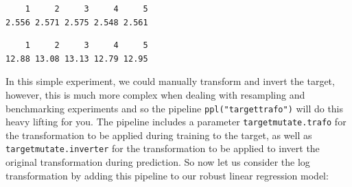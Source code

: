 \begin{verbatim}
    1     2     3     4     5 
2.556 2.571 2.575 2.548 2.561 
\end{verbatim}

\begin{Shaded}
\begin{Highlighting}[]
\end{Highlighting}
\end{Shaded}

\begin{verbatim}
    1     2     3     4     5 
12.88 13.08 13.13 12.79 12.95 
\end{verbatim}

In this simple experiment, we could manually transform and invert the
target, however, this is much more complex when dealing with resampling
and benchmarking experiments and so the pipeline
\texttt{ppl("targettrafo")} will do this heavy lifting for you. The
pipeline includes a parameter \texttt{targetmutate.trafo} for the
transformation to be applied during training to the target, as well as
\texttt{targetmutate.inverter} for the transformation to be applied to
invert the original transformation during prediction. So now let us
consider the log transformation by adding this pipeline to our robust
linear regression model:

\begin{Shaded}
\begin{Highlighting}[]
\OtherTok{=} \NormalTok{(}\NormalTok{(}\NormalTok{,}
   
   \NormalTok{(} \SpecialCharTok{$}
\SpecialCharTok{$}\OtherTok{=} 

\OtherTok{=} \NormalTok{(}
\SpecialCharTok{$}
\SpecialCharTok{$}\NormalTok{(}
\end{Highlighting}
\end{Shaded}

